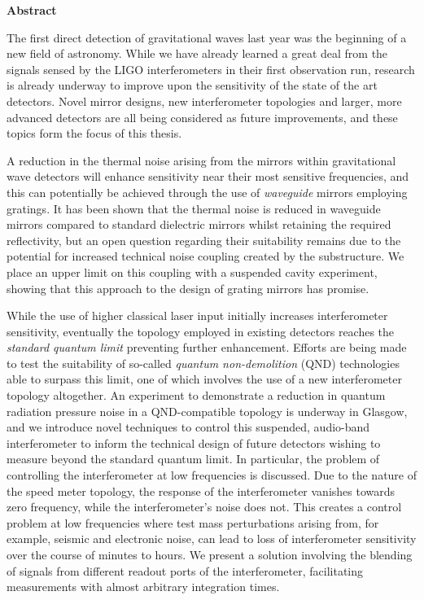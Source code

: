 \begin{center} {\bf Abstract}\end{center}

The first direct detection of gravitational waves last year was the beginning of a new field of astronomy. While we have already learned a great deal from the signals sensed by the LIGO interferometers in their first observation run, research is already underway to improve upon the sensitivity of the state of the art detectors. Novel mirror designs, new interferometer topologies and larger, more advanced detectors are all being considered as future improvements, and these topics form the focus of this thesis.

A reduction in the thermal noise arising from the mirrors within gravitational wave detectors will enhance sensitivity near their most sensitive frequencies, and this can potentially be achieved through the use of \emph{waveguide} mirrors employing gratings. It has been shown that the thermal noise is reduced in waveguide mirrors compared to standard dielectric mirrors whilst retaining the required reflectivity, but an open question regarding their suitability remains due to the potential for increased technical noise coupling created by the substructure. We place an upper limit on this coupling with a suspended cavity experiment, showing that this approach to the design of grating mirrors has promise.

While the use of higher classical laser input initially increases interferometer sensitivity, eventually the \MI{} topology employed in existing detectors reaches the \emph{standard quantum limit} preventing further enhancement. Efforts are being made to test the suitability of so-called \emph{quantum non-demolition} (QND) technologies able to surpass this limit, one of which involves the use of a new interferometer topology altogether. An experiment to demonstrate a reduction in quantum radiation pressure noise in a QND-compatible \SSM{} topology is underway in Glasgow, and we introduce novel techniques to control this suspended, audio-band interferometer to inform the technical design of future detectors wishing to measure beyond the standard quantum limit. In particular, the problem of controlling the interferometer at low frequencies is discussed. Due to the nature of the speed meter topology, the response of the interferometer vanishes towards zero frequency, while the interferometer's noise does not. This creates a control problem at low frequencies where test mass perturbations arising from, for example, seismic and electronic noise, can lead to loss of interferometer sensitivity over the course of minutes to hours. We present a solution involving the blending of signals from different readout ports of the interferometer, facilitating measurements with almost arbitrary integration times.

